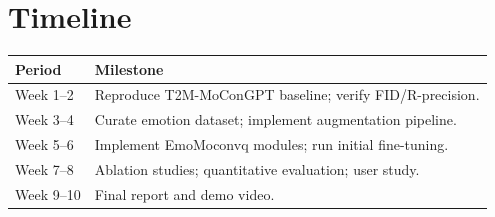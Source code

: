 \documentclass[conference]{IEEEtran}
\begin{document}
\section{Timeline}

\begin{center}
\small
\begin{tabular}{p{2.5cm} p{5cm}}
\toprule
\textbf{Period} & \textbf{Milestone} \\
\midrule
Week 1--2  & Reproduce T2M-MoConGPT baseline; verify FID/R-precision. \\
Week 3--4  & Curate emotion dataset; implement augmentation pipeline. \\
Week 5--6  & Implement EmoMoconvq modules; run initial fine-tuning. \\
Week 7--8 & Ablation studies; quantitative evaluation; user study. \\
Week 9--10 & Final report and demo video. \\
\bottomrule
\end{tabular}
\end{center}






\end{document}
